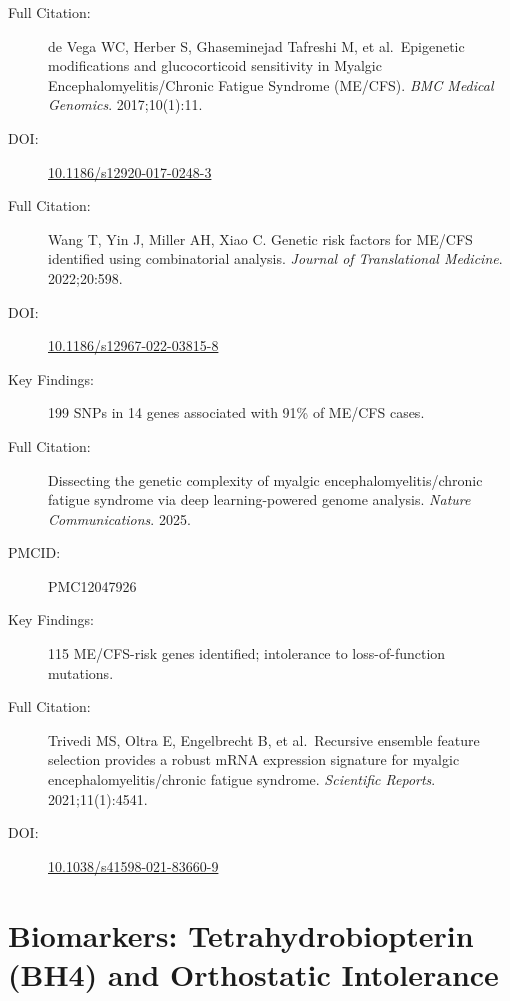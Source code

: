 \begin{description}
    \item[Full Citation:] de Vega WC, Herber S, Ghaseminejad Tafreshi M, et al.\ Epigenetic modifications and glucocorticoid sensitivity in Myalgic Encephalomyelitis/Chronic Fatigue Syndrome (ME/CFS). \textit{BMC Medical Genomics}. 2017;10(1):11.
    \item[DOI:] \href{https://doi.org/10.1186/s12920-017-0248-3}{10.1186/s12920-017-0248-3}
\end{description}

\begin{description}
    \item[Full Citation:] Wang T, Yin J, Miller AH, Xiao C. Genetic risk factors for ME/CFS identified using combinatorial analysis. \textit{Journal of Translational Medicine}. 2022;20:598.
    \item[DOI:] \href{https://doi.org/10.1186/s12967-022-03815-8}{10.1186/s12967-022-03815-8}
    \item[Key Findings:] 199 SNPs in 14 genes associated with 91\% of ME/CFS cases.
\end{description}

\begin{description}
    \item[Full Citation:] Dissecting the genetic complexity of myalgic encephalomyelitis/chronic fatigue syndrome via deep learning-powered genome analysis. \textit{Nature Communications}. 2025.
    \item[PMCID:] PMC12047926
    \item[Key Findings:] 115 ME/CFS-risk genes identified; intolerance to loss-of-function mutations.
\end{description}

\begin{description}
    \item[Full Citation:] Trivedi MS, Oltra E, Engelbrecht B, et al.\ Recursive ensemble feature selection provides a robust mRNA expression signature for myalgic encephalomyelitis/chronic fatigue syndrome. \textit{Scientific Reports}. 2021;11(1):4541.
    \item[DOI:] \href{https://doi.org/10.1038/s41598-021-83660-9}{10.1038/s41598-021-83660-9}
\end{description}

\section{Biomarkers: Tetrahydrobiopterin (BH4) and Orthostatic Intolerance}
\label{sec:bib-bh4-biomarkers}

